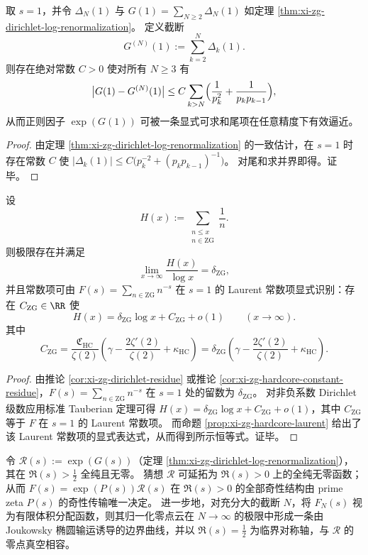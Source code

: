 

\begin{proposition}[临界重整化常数的可计算误差界]\label{prop:xi-zg-holographic-constant-tail-bound}
取 \(s=1\)，并令 \(\Delta_N(1)\) 与 \(G(1)=\sum_{N\ge 2}\Delta_N(1)\) 如定理 \ref{thm:xi-zg-dirichlet-log-renormalization}。
定义截断
\[
G^{(N)}(1):=\sum_{k=2}^{N}\Delta_k(1).
\]
则存在绝对常数 \(C>0\) 使对所有 \(N\ge 3\) 有
\[
\bigl|G(1)-G^{(N)}(1)\bigr|
\le
C\sum_{k>N}\Bigl(\frac1{p_k^2}+\frac1{p_kp_{k-1}}\Bigr),
\]
从而正则因子 \(\exp(G(1))\) 可被一条显式可求和尾项在任意精度下有效逼近。
\end{proposition}

\begin{proof}
由定理 \ref{thm:xi-zg-dirichlet-log-renormalization} 的一致估计，在 \(s=1\) 时存在常数 \(C\) 使
\(
|\Delta_k(1)|
\le C\bigl(p_k^{-2}+(p_kp_{k-1})^{-1}\bigr)
\)。
对尾和求并界即得。证毕。
\end{proof}

\begin{theorem}\label{thm:xi-zg-log-mertens}
设
\[
H(x):=\sum_{\substack{n\le x\\ n\in\mathrm{ZG}}}\frac1n.
\]
则极限存在并满足
\[
\lim_{x\to\infty}\frac{H(x)}{\log x}=\delta_{\mathrm{ZG}},
\]
并且常数项可由 \(F(s)=\sum_{n\in\mathrm{ZG}}n^{-s}\) 在 \(s=1\) 的 Laurent 常数项显式识别：存在 \(C_{\mathrm{ZG}}\in\RR\) 使
\[
H(x)=\delta_{\mathrm{ZG}}\log x+C_{\mathrm{ZG}}+o(1)\qquad(x\to\infty).
\]
其中
\[
C_{\mathrm{ZG}}
=\frac{\mathfrak C_{\mathrm{HC}}}{\zeta(2)}
\left(\gamma-\frac{2\zeta'(2)}{\zeta(2)}+\kappa_{\mathrm{HC}}\right)
=\delta_{\mathrm{ZG}}
\left(\gamma-\frac{2\zeta'(2)}{\zeta(2)}+\kappa_{\mathrm{HC}}\right).
\]
\end{theorem}

\begin{proof}
由推论 \ref{cor:xi-zg-dirichlet-residue} 或推论 \ref{cor:xi-zg-hardcore-constant-residue}，\(F(s)=\sum_{n\in\mathrm{ZG}}n^{-s}\) 在 \(s=1\) 处的留数为 \(\delta_{\mathrm{ZG}}\)。
对非负系数 Dirichlet 级数应用标准 Tauberian 定理可得
\(
H(x)=\delta_{\mathrm{ZG}}\log x+C_{\mathrm{ZG}}+o(1)
\)，其中 \(C_{\mathrm{ZG}}\) 等于 \(F\) 在 \(s=1\) 的 Laurent 常数项。
而命题 \ref{prop:xi-zg-hardcore-laurent} 给出了该 Laurent 常数项的显式表达式，从而得到所示恒等式。证毕。
\end{proof}

\begin{conjecture}\label{conj:xi-zg-leyang-godel-transport-boundary}
令 \(\mathcal R(s):=\exp(G(s))\)（定理 \ref{thm:xi-zg-dirichlet-log-renormalization}），其在 \(\Re(s)>\tfrac12\) 全纯且无零。
猜想 \(\mathcal R\) 可延拓为 \(\Re(s)>0\) 上的全纯无零函数；从而 \(F(s)=\exp(P(s))\mathcal R(s)\) 在 \(\Re(s)>0\) 的全部奇性结构由 prime zeta \(P(s)\) 的奇性传输唯一决定。
进一步地，对充分大的截断 \(N\)，将 \(F_N(s)\) 视为有限体积分配函数，则其归一化零点云在 \(N\to\infty\) 的极限中形成一条由 Joukowsky 椭圆输运诱导的边界曲线，并以 \(\Re(s)=\tfrac12\) 为临界对称轴，与 \(\mathcal R\) 的零点真空相容。
\end{conjecture}

